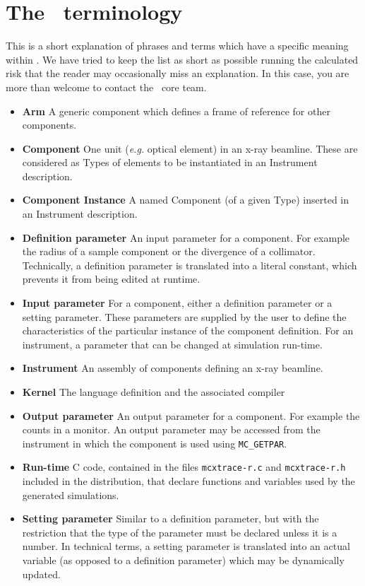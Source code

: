
\chapter{The \MCX\ terminology}
\label{s:terminology}

This is a short explanation of phrases and terms which have a specific
meaning within \MCX. We have tried to keep the list as short
as possible running the calculated risk that the reader may occasionally miss
an explanation. In this case, you are more than welcome to contact
the \MCX\ core team.

\noindent
\begin{itemize}
\item\textbf{Arm}  A generic \MCX component which defines a frame of reference
      for other components.
\item\textbf{Component} One unit ({\em e.g.} optical element) in an x-ray beamline. These are considered as Types of elements to be instantiated in an Instrument description.
\item\textbf{Component Instance} A named Component (of a given Type) inserted in an Instrument description.
\item\textbf{Definition parameter} An input parameter for a component. For
  example the radius of a sample component or the divergence of a collimator. Technically, a definition parameter 
  is translated into a literal constant, which prevents it from being edited at runtime. 
\item\textbf{ Input parameter} For a component, either a definition parameter
or a setting parameter. These parameters are supplied by the user to
define the characteristics of the particular instance of the component
definition. For an instrument, a parameter that can be changed at
simulation run-time.
\item\textbf{ Instrument} An assembly of \MCX components defining
      an x-ray beamline.
\item\textbf{ Kernel} The \MCX language definition and the associated compiler
\item\textbf{ Output parameter} An output parameter for a component.
  For example the counts in a monitor. An output parameter may be
  accessed from the instrument in which the component is used using
  \verb`MC_GETPAR`.
\item\textbf{ Run-time} C code, contained in the files
  \verb+mcxtrace-r.c+ and \verb+mcxtrace-r.h+ included in the \MCX
  distribution, that declare functions and variables used by the
  generated simulations.
\item\textbf{ Setting parameter} Similar to a definition parameter, but with the
  restriction that the type of the parameter must be declared unless it is a number. In technical terms, 
  a setting parameter is translated into an actual variable (as opposed to a definition parameter) which 
  may be dynamically updated.
\end{itemize}
